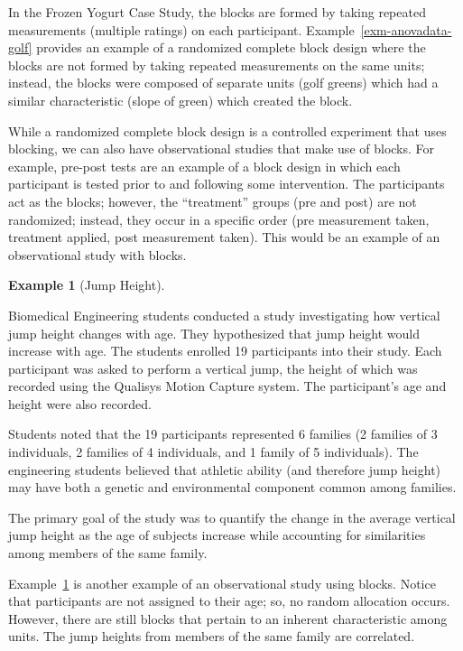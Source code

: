 \documentclass[
  letterpaper,
  DIV=11,
  numbers=noendperiod]{scrreprt}
\theoremstyle{plain}
\theoremstyle{definition}
\newtheorem{example}{Example}[chapter]
\theoremstyle{definition}
\theoremstyle{remark}
\begin{document}
In the Frozen Yogurt Case Study, the blocks are formed by taking
repeated measurements (multiple ratings) on each participant.
Example~\ref{exm-anovadata-golf} provides an example of a randomized
complete block design where the blocks are not formed by taking repeated
measurements on the same units; instead, the blocks were composed of
separate units (golf greens) which had a similar characteristic (slope
of green) which created the block.

While a randomized complete block design is a controlled experiment that
uses blocking, we can also have observational studies that make use of
blocks. For example, pre-post tests are an example of a block design in
which each participant is tested prior to and following some
intervention. The participants act as the blocks; however, the
``treatment'' groups (pre and post) are not randomized; instead, they
occur in a specific order (pre measurement taken, treatment applied,
post measurement taken). This would be an example of an observational
study with blocks.

\begin{example}[Jump
Height]\protect\hypertarget{exm-blockdata-jumpheight}{}\label{exm-blockdata-jumpheight}

Biomedical Engineering students conducted a study investigating how
vertical jump height changes with age. They hypothesized that jump
height would increase with age. The students enrolled 19 participants
into their study. Each participant was asked to perform a vertical jump,
the height of which was recorded using the Qualisys Motion Capture
system. The participant's age and height were also recorded.

Students noted that the 19 participants represented 6 families (2
families of 3 individuals, 2 families of 4 individuals, and 1 family of
5 individuals). The engineering students believed that athletic ability
(and therefore jump height) may have both a genetic and environmental
component common among families.

The primary goal of the study was to quantify the change in the average
vertical jump height as the age of subjects increase while accounting
for similarities among members of the same family.

\end{example}

Example~\ref{exm-blockdata-jumpheight} is another example of an
observational study using blocks. Notice that participants are not
assigned to their age; so, no random allocation occurs. However, there
are still blocks that pertain to an inherent characteristic among units.
The jump heights from members of the same family are correlated.
\end{document}
